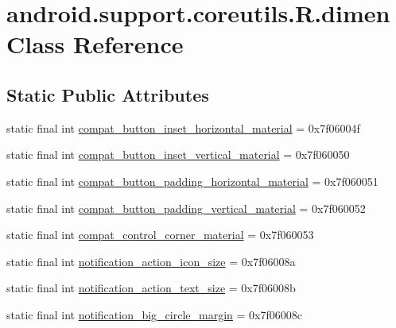 \hypertarget{classandroid_1_1support_1_1coreutils_1_1R_1_1dimen}{}\section{android.\+support.\+coreutils.\+R.\+dimen Class Reference}
\label{classandroid_1_1support_1_1coreutils_1_1R_1_1dimen}
\subsection*{Static Public Attributes}
\begin{DoxyCompactItemize}
\item 
static final int \mbox{\hyperlink{classandroid_1_1support_1_1coreutils_1_1R_1_1dimen_a3eda6883fabb40fd1a42d367c9d84546}{compat\+\_\+button\+\_\+inset\+\_\+horizontal\+\_\+material}} = 0x7f06004f
\item 
static final int \mbox{\hyperlink{classandroid_1_1support_1_1coreutils_1_1R_1_1dimen_a1a581e0badd6274fd0f459cb7947dffc}{compat\+\_\+button\+\_\+inset\+\_\+vertical\+\_\+material}} = 0x7f060050
\item 
static final int \mbox{\hyperlink{classandroid_1_1support_1_1coreutils_1_1R_1_1dimen_a83eadc9252b9318b03a426348f03b27b}{compat\+\_\+button\+\_\+padding\+\_\+horizontal\+\_\+material}} = 0x7f060051
\item 
static final int \mbox{\hyperlink{classandroid_1_1support_1_1coreutils_1_1R_1_1dimen_ac79aade48ea532c4173da6d630ff19e0}{compat\+\_\+button\+\_\+padding\+\_\+vertical\+\_\+material}} = 0x7f060052
\item 
static final int \mbox{\hyperlink{classandroid_1_1support_1_1coreutils_1_1R_1_1dimen_a8fceafeb765594a0a0989e0d8f851870}{compat\+\_\+control\+\_\+corner\+\_\+material}} = 0x7f060053
\item 
static final int \mbox{\hyperlink{classandroid_1_1support_1_1coreutils_1_1R_1_1dimen_abd6b6e58abcb4ced360e86029e3e7c38}{notification\+\_\+action\+\_\+icon\+\_\+size}} = 0x7f06008a
\item 
static final int \mbox{\hyperlink{classandroid_1_1support_1_1coreutils_1_1R_1_1dimen_a6118f81c0331cdd2b9ee3a70ccfadb7c}{notification\+\_\+action\+\_\+text\+\_\+size}} = 0x7f06008b
\item 
static final int \mbox{\hyperlink{classandroid_1_1support_1_1coreutils_1_1R_1_1dimen_a5953ab2be3dcb6f580440fd10a42e505}{notification\+\_\+big\+\_\+circle\+\_\+margin}} = 0x7f06008c
\item 

\end{DoxyCompactItemize}
